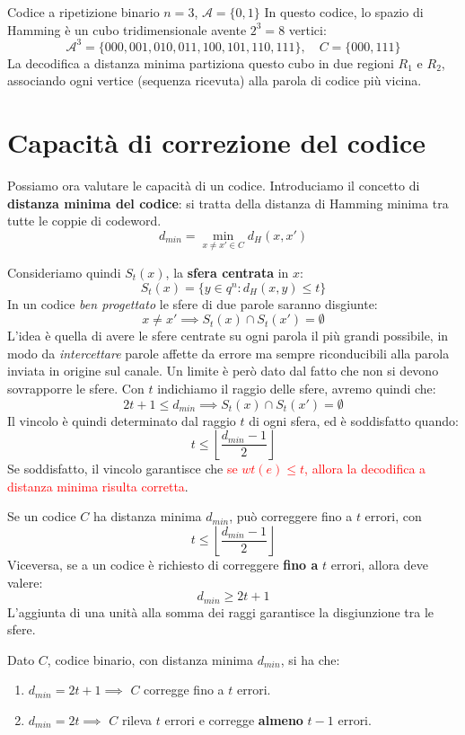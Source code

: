 \begin{esempio}{Codice a ripetizione binario $n=3$, $\mathcal{A}=\{0,1\}$}
In questo codice, lo spazio di Hamming è un cubo tridimensionale avente $2^3 = 8$ vertici:
\[\mathcal{A}^3= \{000,001,010,011,100,101,110,111\}, \quad C=\{000,111\}\]
La decodifica a distanza minima partiziona questo cubo in due regioni $R_1$ e $R_2$, associando ogni vertice (sequenza ricevuta) alla parola di codice più vicina.
\end{esempio}





\section{Capacità di correzione del codice}

Possiamo ora valutare le capacità di un codice.
Introduciamo il concetto di \textbf{distanza minima del codice}: si tratta della distanza di Hamming minima tra tutte le coppie di codeword.
\[d_{min} = \min_{x \neq x' \in C}{d_H(x,x')}\]

Consideriamo quindi $S_t(x)$, la \textbf{sfera centrata} in $x$:
\[S_t(x) = \{y \in q^n: d_H(x,y)\leq t\}\]
In un codice \textit{ben progettato} le sfere di due parole saranno disgiunte:
\[x \neq x'  \implies  S_t(x) \cap  S_t(x') = \emptyset \]
L'idea è quella di avere le sfere centrate su ogni parola il più grandi possibile, in modo da \textit{intercettare} parole affette da errore ma sempre riconducibili alla parola inviata in origine sul canale. Un limite è però dato dal fatto che non si devono sovrapporre le sfere.
Con $t$ indichiamo il raggio delle sfere, avremo quindi che:
\[2t+1 \leq d_{min} \implies S_t(x) \cap S_t(x')= \emptyset\]
Il vincolo è quindi determinato dal raggio $t$ di ogni sfera, ed è soddisfatto quando:
\[t \leq \left\lfloor \frac{d_{min}-1}{2} \right\rfloor\]
Se soddisfatto, il vincolo garantisce che \textcolor{red}{ se $wt(e) \leq t$, allora la decodifica a distanza minima risulta corretta}.

Se un codice $C$ ha distanza minima $d_{min}$, può correggere fino a $t$ errori, con 
\[t \leq \left\lfloor \frac{d_{min}-1}{2} \right\rfloor \]
Viceversa, se a un codice è richiesto di correggere \textbf{fino a} $t$ errori, allora deve valere:
\[ d_{min}\geq 2t+1\]
L'aggiunta di una unità alla somma dei raggi garantisce la disgiunzione tra le sfere.

Dato $C$, codice binario, con distanza minima $d_{min}$, si ha che:
\begin{enumerate}
    \item $d_{min} = 2t+1 \implies$ $C$ corregge fino a $t$ errori.
    \item $d_{min} = 2t \implies$ $C$ rileva $t$ errori e corregge \textbf{almeno} $t-1$ errori.
\end{enumerate}

